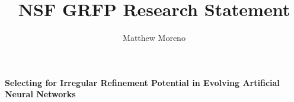 \documentclass[12pt]{article}
\title{NSF GRFP Research Statement}
\author{Matthew Moreno}
\begin{document}
\begin{center}
{
 \textbf{Selecting for Irregular Refinement Potential in Evolving Artificial Neural Networks}
}
\end{center}
\vspace{-2.2ex}

















%

%

%

%
\end{document}
